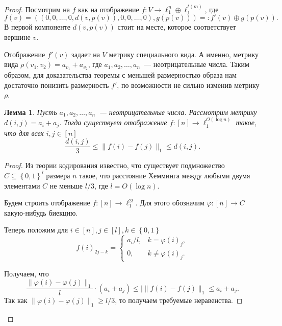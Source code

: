 \documentclass[12pt]{article}
\newcommand{\set}[1]{\left\{#1\right\}}
\newcommand{\zo}{\set{0, 1}}
\newtheorem{lemma}{Лемма}
\begin{document}
\begin{proof}
        Посмотрим на $f$ как на отображение $f \colon V \to \ell_1^n \oplus \ell_1^{t(m)}$,
        где
        $$
          f(v) = ((0, 0, \ldots, 0, d(v, p(v)), 0, 0, \ldots, 0), g(p(v))) =: f'(v) \oplus g(p(v)).
        $$ В первой компоненте 
        $d(v, p(v))$ стоит на месте, которое соответствует вершине $v$.

        Отображение $f'(v)$ задает на $V$ метрику специального вида. А именно,
        метрику вида $\rho(v_1, v_2) = a_{v_1} + a_{v_2}$,
        где $a_1, a_2, \ldots, a_n$~--- неотрицательные числа.
        Таким образом, для доказательства теоремы с меньшей размерностью образа нам достаточно понизить
        размерность $f'$, по возможности не сильно изменив метрику $\rho$.

        \begin{lemma}
            Пусть $a_1, a_2, \ldots, a_n$~--- неотрицательные числа. Рассмотрим метрику $d(i, j) = a_i + a_j$.
            Тогда существует отображение $f \colon [n] \to \ell_1^{O(\log n)}$ такое, что для всех $i, j \in [n]$
            $$
                \frac{d(i, j)}{3} \leq \|f(i) - f(j)\|_1 \leq d(i, j).
            $$
        \end{lemma}
        \begin{proof}
            Из теории кодирования известно, что существует подмножество $C \subseteq \zo^{l}$ размера $n$
            такое, что расстояние Хемминга между любыми двумя элементами $C$ не меньше $l / 3$, где $l = O(\log n)$.

            Будем строить отображение $f \colon [n] \to \ell_1^{2l}$. Для этого обозначим $\varphi \colon [n] \to C$
            какую-нибудь биекцию.

            Теперь положим для $i \in [n], j \in [l], k \in \zo$
            $$
                f(i)_{2j-k} = \begin{cases}
                    a_i / l, & k = \varphi(i)_j, \\
                    0, & k \ne \varphi(i)_j.
                \end{cases}
            $$

            Получаем, что 
            $$
                \frac{\|\varphi(i) - \varphi(j)\|_1}{l} \cdot (a_i + a_j) \leq|\|f(i) - f(j)\|_1 \leq a_i + a_j.
            $$
            Так как $\|\varphi(i) - \varphi(j)\|_1 \geq l / 3$, то получаем требуемые неравенства.

        \end{proof}
    \end{proof}
\end{document}
